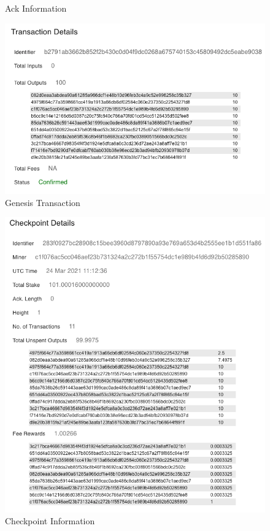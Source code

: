 \begin{enumerate}
\begin{figure}[!htb]
		  \caption{Ack Information}
		\label{fig:ramu_v_ack_info}
		\endminipage
		\hfill
		  \includegraphics[width=\linewidth]{figures/images/ramu/v_genesis_txn_info.png}
		  \caption{Genesis Transaction}
		\label{fig:ramu_v_genesis_info}
		\endminipage
	\end{figure}
	\begin{figure}[htbp]
		\centering
		\includegraphics[width=0.8\linewidth]{figures/images/ramu/v_checkpoint_info.png}
		\caption{Checkpoint Information}
		\label{fig:ramu_ui_ckpt_info}
	\end{figure}
\end{enumerate}

